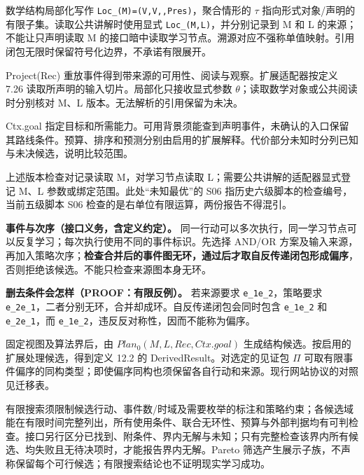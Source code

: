 \documentclass[UTF8,a4paper,zihao=-4,fontset=windows,openany]{ctexbook}
\newcommand{\mcssub}[1]{\ensuremath{_{\mathrm{#1}}}}
\def\ensuremath#1{#1}%
\def\mathrm#1{#1}%
\newcommand{\mcsbrk}{\penalty 200\relax}
\begin{document}
数学结构局部化写作 \texttt{Loc\mcsbrk\_\ensuremath{\lambda}(M)=(V,\mcsbrk{}\ensuremath{\partial}V,\mcsbrk{}\ensuremath{\tau},\mcsbrk{}Pres)}，聚合情形的 \(\tau\) 指向形式对象/声明的有限子集。读取公共讲解时使用显式 \texttt{Loc\mcsbrk\_\ensuremath{\lambda}(M,\mcsbrk{}L)}，并分别记录到 M 和 L 的来源；不能让只声明读取 M 的接口暗中读取学习节点。溯源对应不强称单值映射。引用闭包无限时保留符号化边界，不承诺有限展开。

Project(Rec) 重放事件得到带来源的可用性、阅读与观察。扩展适配器按定义 7.26 读取所声明的输入切片。局部化只接收显式参数 \(\theta\)；读取数学对象或公共阅读时分别核对 M、L 版本。无法解析的引用保留为未决。

Ctx.goal 指定目标和所需能力。可用背景须能查到声明事件，未确认的入口保留其路线条件。预算、排序和预测分别由启用的扩展解释。代价部分未知时分列已知与未决候选，说明比较范围。

上述版本检查对记录读取 M，对学习节点读取 L；需要公共讲解的适配器显式登记 M、L 参数或绑定范围。此处“未知最优”的 S06 指历史六级脚本的检查编号，当前五级脚本 S06 检查的是右单位有限运算，两份报告不得混引。

\textbf{事件与次序（接口义务，含定义约定）。} 同一行动可以多次执行，同一学习节点可以反复学习；每次执行使用不同的事件标识。先选择 AND/OR 方案及输入来源，再加入策略次序；\textbf{检查合并后的事件图无环，通过后才取自反传递闭包形成偏序}，否则拒绝该候选。不能只检查来源图本身无环。

\textbf{删去条件会怎样（PROOF：有限反例）。} 若来源要求 \texttt{e\mcssub{1}\ensuremath{\to}e\mcssub{2}}，策略要求 \texttt{e\mcssub{2}\ensuremath{\to}e\mcssub{1}}，二者分别无环，合并却成环。自反传递闭包会同时包含 \texttt{e\mcssub{1}\ensuremath{\preceq}e\mcssub{2}} 和 \texttt{e\mcssub{2}\ensuremath{\preceq}e\mcssub{1}}，而 \texttt{e\mcssub{1}\ensuremath{\ne}e\mcssub{2}}，违反反对称性，因而不能称为偏序。

固定视图及算法界后，由 \(\mathrm{Plan}_{0}(M,L,\mathrm{Rec},\mathrm{Ctx}.\mathrm{goal})\) 生成结构候选。按启用的扩展处理候选，得到定义 12.2 的 DerivedResult。对选定的见证包 \(\Pi\) 可取有限事件偏序的同构类型；即使偏序同构也须保留各自行动和来源。现行网站协议的对照见迁移表。

有限搜索须限制候选行动、事件数/时域及需要枚举的标注和策略约束；各候选域能在有限时间完整列出，所有使用条件、联合无环性、预算与外部判据均有可判检查。接口另行区分已找到、附条件、界内无解与未知；只有完整检查该界内所有候选、均失败且无待决项时，才能报告界内无解。Pareto 筛选产生展示子族，不声称保留每个可行候选；有限搜索结论也不证明现实学习成功。
\end{document}
